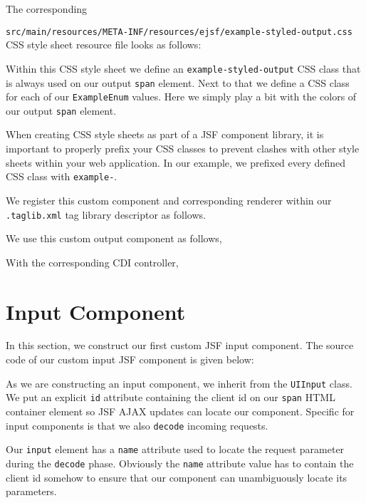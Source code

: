 The corresponding

\texttt{src/main/resources/META-INF/resources/ejsf/example-styled-output.css} CSS style sheet resource file looks as follows:

Within this CSS style sheet we define an \texttt{example-styled-output} CSS class that is always used on our output \texttt{span} element.
Next to that we define a CSS class for each of our \texttt{ExampleEnum} values.
Here we simply play a bit with the colors of our output \texttt{span} element.

When creating CSS style sheets as part of a JSF component library, it is important to properly prefix your CSS classes to prevent clashes with other style sheets within your web application.
In our example, we prefixed every defined CSS class with \texttt{example-}.

We register this custom component and corresponding renderer within our \texttt{.taglib.xml} tag library descriptor as follows.


We use this custom output component as follows,


With the corresponding CDI controller,



\section{Input Component}
In this section, we construct our first custom JSF input component.
The source code of our custom input JSF component is given below:

As we are constructing an input component, we inherit from the \texttt{UIInput} class.
We put an explicit \texttt{id} attribute containing the client id on our \texttt{span} HTML container element so JSF AJAX updates can locate our component.
Specific for input components is that we also \texttt{decode} incoming requests.

Our \texttt{input} element has a \texttt{name} attribute used to locate the request parameter during the \texttt{decode} phase.
Obviously the \texttt{name} attribute value has to contain the client id somehow to ensure that our component can unambiguously locate its parameters.

